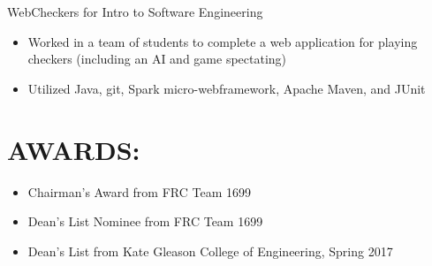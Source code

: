\documentclass[line,margin]{res}
\begin{document}
\begin{resume}
	WebCheckers for Intro to Software Engineering
	\begin{itemize}
		\item Worked in a team of students to complete a web application for playing checkers (including an AI and game spectating)
		\item Utilized Java, git, Spark micro-webframework, Apache Maven, and JUnit
	\end{itemize}

%
%
%

\section{AWARDS:}
	\begin{itemize}
		\setlength{\itemindent}{-15pt}
		\item Chairman's Award from FRC Team 1699
		\item Dean's List Nominee from FRC Team 1699
		\item Dean's List from Kate Gleason College of Engineering, Spring 2017
	\end{itemize}



\end{resume}
\end{document}
